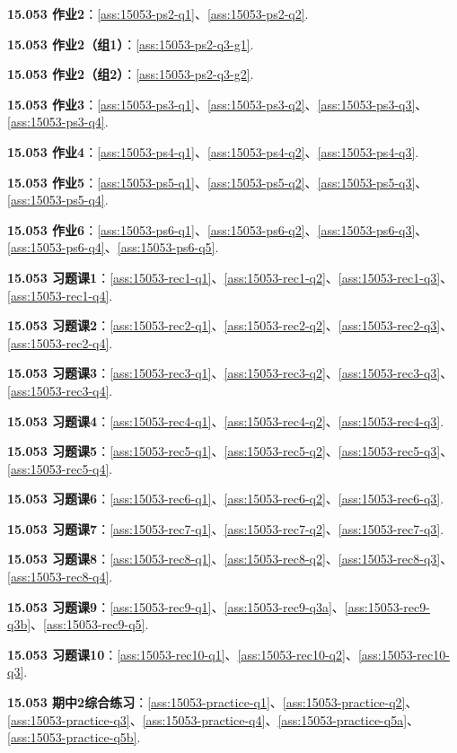 \noindent\textbf{15.053 作业2}：\ref{ass:15053-ps2-q1}、\ref{ass:15053-ps2-q2}.\par
\noindent\textbf{15.053 作业2（组1）}：\ref{ass:15053-ps2-q3-g1}.\par
\noindent\textbf{15.053 作业2（组2）}：\ref{ass:15053-ps2-q3-g2}.\par
\noindent\textbf{15.053 作业3}：\ref{ass:15053-ps3-q1}、\ref{ass:15053-ps3-q2}、\ref{ass:15053-ps3-q3}、\ref{ass:15053-ps3-q4}.\par
\noindent\textbf{15.053 作业4}：\ref{ass:15053-ps4-q1}、\ref{ass:15053-ps4-q2}、\ref{ass:15053-ps4-q3}.\par
\noindent\textbf{15.053 作业5}：\ref{ass:15053-ps5-q1}、\ref{ass:15053-ps5-q2}、\ref{ass:15053-ps5-q3}、\ref{ass:15053-ps5-q4}.\par
\noindent\textbf{15.053 作业6}：\ref{ass:15053-ps6-q1}、\ref{ass:15053-ps6-q2}、\ref{ass:15053-ps6-q3}、\ref{ass:15053-ps6-q4}、\ref{ass:15053-ps6-q5}.\par
\noindent\textbf{15.053 习题课1}：\ref{ass:15053-rec1-q1}、\ref{ass:15053-rec1-q2}、\ref{ass:15053-rec1-q3}、\ref{ass:15053-rec1-q4}.\par
\noindent\textbf{15.053 习题课2}：\ref{ass:15053-rec2-q1}、\ref{ass:15053-rec2-q2}、\ref{ass:15053-rec2-q3}、\ref{ass:15053-rec2-q4}.\par
\noindent\textbf{15.053 习题课3}：\ref{ass:15053-rec3-q1}、\ref{ass:15053-rec3-q2}、\ref{ass:15053-rec3-q3}、\ref{ass:15053-rec3-q4}.\par
\noindent\textbf{15.053 习题课4}：\ref{ass:15053-rec4-q1}、\ref{ass:15053-rec4-q2}、\ref{ass:15053-rec4-q3}.\par
\noindent\textbf{15.053 习题课5}：\ref{ass:15053-rec5-q1}、\ref{ass:15053-rec5-q2}、\ref{ass:15053-rec5-q3}、\ref{ass:15053-rec5-q4}.\par
\noindent\textbf{15.053 习题课6}：\ref{ass:15053-rec6-q1}、\ref{ass:15053-rec6-q2}、\ref{ass:15053-rec6-q3}.\par
\noindent\textbf{15.053 习题课7}：\ref{ass:15053-rec7-q1}、\ref{ass:15053-rec7-q2}、\ref{ass:15053-rec7-q3}.\par
\noindent\textbf{15.053 习题课8}：\ref{ass:15053-rec8-q1}、\ref{ass:15053-rec8-q2}、\ref{ass:15053-rec8-q3}、\ref{ass:15053-rec8-q4}.\par
\noindent\textbf{15.053 习题课9}：\ref{ass:15053-rec9-q1}、\ref{ass:15053-rec9-q3a}、\ref{ass:15053-rec9-q3b}、\ref{ass:15053-rec9-q5}.\par
\noindent\textbf{15.053 习题课10}：\ref{ass:15053-rec10-q1}、\ref{ass:15053-rec10-q2}、\ref{ass:15053-rec10-q3}.\par
\noindent\textbf{15.053 期中2综合练习}：\ref{ass:15053-practice-q1}、\ref{ass:15053-practice-q2}、\ref{ass:15053-practice-q3}、\ref{ass:15053-practice-q4}、\ref{ass:15053-practice-q5a}、\ref{ass:15053-practice-q5b}.\par
